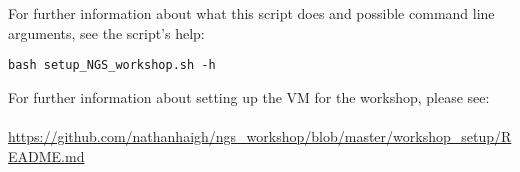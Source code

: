 For further information about what this script does and possible command line
arguments, see the script's help:
\begin{lstlisting}
bash setup_NGS_workshop.sh -h
\end{lstlisting}


For further information about setting up the VM for the workshop, please see:
\\\\
\url{https://github.com/nathanhaigh/ngs_workshop/blob/master/workshop_setup/README.md}
